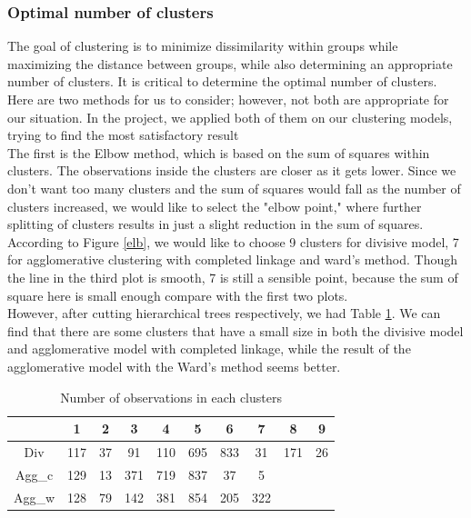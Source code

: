 \subsubsection{Optimal number of clusters}

The goal of clustering is to minimize dissimilarity within groups while maximizing the distance between groups, while also determining an appropriate number of clusters. It is critical to determine the optimal number of clusters. Here are two methods for us to consider; however, not both are appropriate for our situation\cite{reusova2018hierarchical}. In the project, we applied both of them on our clustering models, trying to find the most satisfactory result\\

The first is the Elbow method, which is based on the sum of squares within clusters. The observations inside the clusters are closer as it gets lower. Since we don't want too many clusters and the sum of squares would fall as the number of clusters increased, we would like to select the "elbow point," where further splitting of clusters results in just a slight reduction in the sum of squares. According to Figure \ref{elb}, we would like to choose 9 clusters for divisive model, 7 for agglomerative clustering with completed linkage and ward's method. Though the line in the third plot is smooth, 7 is still a sensible point, because the sum of square here is small enough compare with the first two plots.\\
However, after cutting hierarchical trees respectively, we had Table \ref{t3}. We can find that there are some clusters that have a small size in both the divisive model and agglomerative model with completed linkage, while the result of the agglomerative model with the Ward's method seems better. 

\begin{table}[!h]
\begin{center}
\begin{tabular}{ c | c c c c c c c c c}
\hline 
& 1& 2 & 3& 4& 5& 6& 7 & 8 & 9\\
\hline
Div & 117 & 37&  91& 110 &695 &833 & 31& 171 &  26 \\
Agg_c & 129 & 13 &371 &719& 837 & 37  & 5 & & \\
Agg_w & 128 & 79 & 142 & 381  & 854 & 205 & 322 \\
\end{tabular}
\caption{\label{t3} Number of observations in each clusters}
\end{center}
\end{table}

